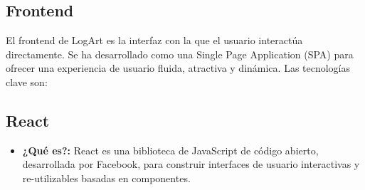 \subsection{Frontend}
\label{sec:frontendTech}

El frontend de LogArt es la interfaz con la que el usuario interactúa directamente. Se ha desarrollado como una Single Page Application (SPA) para ofrecer una experiencia de usuario fluida, atractiva y dinámica. Las tecnologías clave son:

\subsection{React}
\label{sec:react}

    \begin{itemize}
        \item \textbf{¿Qué es?:} React es una biblioteca de JavaScript de código abierto, desarrollada por Facebook, para construir interfaces de usuario interactivas y re-utilizables basadas en componentes. \cite{kinstaQueEsReactJS}


\end{itemize}
